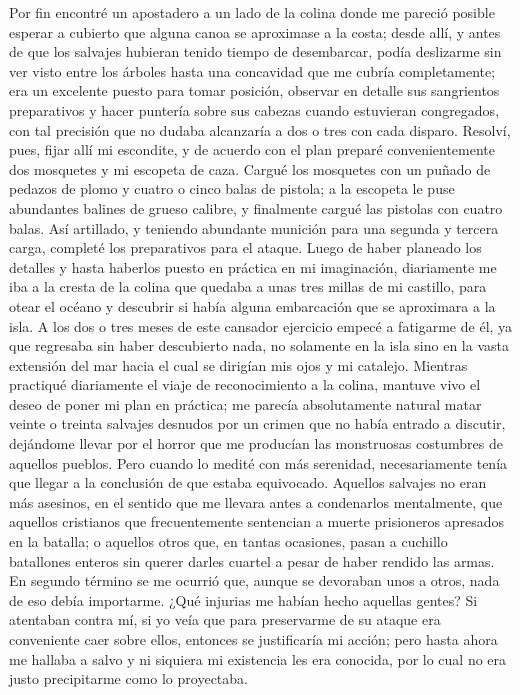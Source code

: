 \documentclass{novela}
\begin{document}
    Por fin encontré un apostadero a un lado de la colina donde me pareció posible esperar a cubierto que alguna canoa se aproximase a la costa; desde allí, y antes de que los salvajes hubieran tenido tiempo de desembarcar, podía deslizarme sin ver visto entre los árboles hasta una concavidad que me cubría completamente; era un excelente puesto para tomar posición, observar en detalle sus sangrientos preparativos y hacer puntería sobre sus cabezas cuando estuvieran congregados, con tal precisión que no dudaba alcanzaría a dos o tres con cada disparo.
    Resolví, pues, fijar allí mi escondite, y de acuerdo con el plan preparé convenientemente dos mosquetes y mi escopeta de caza. Cargué los mosquetes con un puñado de pedazos de plomo y cuatro o cinco balas de pistola; a la escopeta le puse abundantes balines de grueso calibre, y finalmente cargué las pistolas con cuatro balas. Así artillado, y teniendo abundante munición para una segunda y tercera carga, completé los preparativos para el ataque.
    Luego de haber planeado los detalles y hasta haberlos puesto en práctica en mi imaginación, diariamente me iba a la cresta de la colina que quedaba a unas tres millas de mi castillo, para otear el océano y descubrir si había alguna embarcación que se aproximara a la isla. A los dos o tres meses de este cansador ejercicio empecé a fatigarme de él, ya que regresaba sin haber descubierto nada, no solamente en la isla sino en la vasta extensión del mar hacia el cual se dirigían mis ojos y mi catalejo.
    Mientras practiqué diariamente el viaje de reconocimiento a la colina, mantuve vivo el deseo de poner mi plan en práctica; me parecía absolutamente natural matar veinte o treinta salvajes desnudos por un crimen que no había entrado a discutir, dejándome llevar por el horror que me producían las monstruosas costumbres de aquellos pueblos.
    Pero cuando lo medité con más serenidad, necesariamente tenía que llegar a la conclusión de que estaba equivocado. Aquellos salvajes no eran más asesinos, en el sentido que me llevara antes a condenarlos mentalmente, que aquellos cristianos que frecuentemente sentencian a muerte prisioneros apresados en la batalla; o aquellos otros que, en tantas ocasiones, pasan a cuchillo batallones enteros sin querer darles cuartel a pesar de haber rendido las armas.
    En segundo término se me ocurrió que, aunque se devoraban unos a otros, nada de eso debía importarme. ¿Qué injurias me habían hecho aquellas gentes? Si atentaban contra mí, si yo veía que para preservarme de su ataque era conveniente caer sobre ellos, entonces se justificaría mi acción; pero hasta ahora me hallaba a salvo y ni siquiera mi existencia les era conocida, por lo cual no era justo precipitarme como lo proyectaba.
\end{document}
